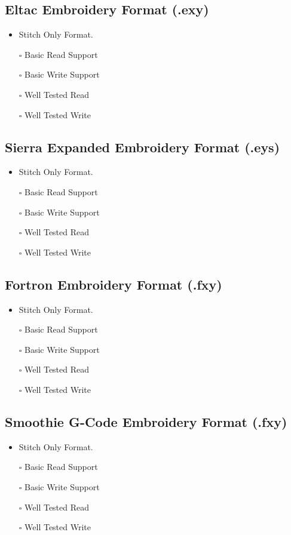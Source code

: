 \documentclass[onesize, a4paper]{refart}
\providecommand{\tightlist}{\setlength{\itemsep}{0pt}\setlength{\parskip}{0pt}}
\begin{document}
\subsection{Eltac Embroidery Format (.exy)}

\begin{itemize}
\tightlist
\item Stitch Only Format.
\item[$\square$] Basic Read Support
\item[$\square$] Basic Write Support
\item[$\square$] Well Tested Read
\item[$\square$] Well Tested Write
\end{itemize}

\subsection{Sierra Expanded Embroidery Format (.eys)}

\begin{itemize}
\tightlist
\item Stitch Only Format.
\item[$\square$] Basic Read Support
\item[$\square$] Basic Write Support
\item[$\square$] Well Tested Read
\item[$\square$] Well Tested Write
\end{itemize}

\subsection{Fortron Embroidery Format (.fxy)}

\begin{itemize}
\tightlist
\item Stitch Only Format.
\item[$\square$] Basic Read Support
\item[$\square$] Basic Write Support
\item[$\square$] Well Tested Read
\item[$\square$] Well Tested Write
\end{itemize}

\subsection{Smoothie G-Code Embroidery Format (.fxy)}

\begin{itemize}
\tightlist
\item Stitch Only Format.
\item[$\square$] Basic Read Support
\item[$\square$] Basic Write Support
\item[$\square$] Well Tested Read
\item[$\square$] Well Tested Write
\end{itemize}
\end{document}
